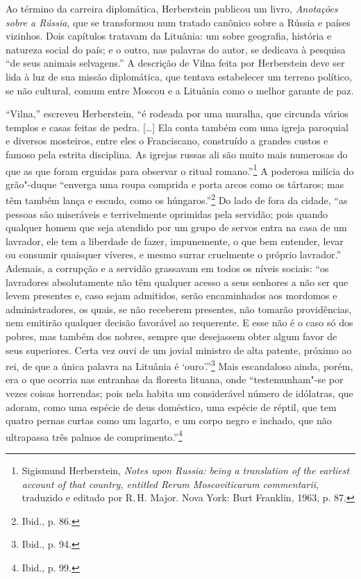 Ao término da carreira diplomática, Herberstein publicou um livro,
\textit{Anotações sobre a Rússia}, que se transformou num tratado canônico
sobre a Rússia e países vizinhos. Dois capítulos tratavam da Lituânia:
um sobre geografia, história e natureza social do país; e o outro, nas
palavras do autor, se dedicava à pesquisa ``de seus animais selvagens.''
A descrição de Vilna feita por Herberstein deve ser lida à luz de sua
missão diplomática, que tentava estabelecer um terreno político, se não
cultural, comum entre Moscou e a Lituânia como o melhor garante de paz.

``Vilna,'' escreveu Herberstein, ``é rodeada por uma muralha, que
circunda vários templos e casas feitas de pedra. {[}\ldots{}{]} Ela
conta também com uma igreja paroquial e diversos mosteiros, entre eles o
Franciscano, construído a grandes custos e famoso pela estrita
disciplina. As igrejas russas ali são muito mais numerosas do que as que
foram erguidas para observar o ritual romano.''\footnote{Sigismund Herberstein, \textit{Notes upon Russia: being a translation of the earliest account of that country, entitled Rerum Moscoviticarum commentarii}, traduzido e editado por R.\,H. Major. Nova York: Burt Franklin, 1963, p. 87.} A poderosa milícia do grão"-duque ``enverga uma roupa comprida e porta arcos como os tártaros; mas têm também lança e
escudo, como os húngaros.''\footnote{Ibid., p. 86.} Do lado de fora da
cidade, ``as pessoas são miseráveis e terrivelmente oprimidas pela
servidão; pois quando qualquer homem que seja atendido por um grupo de
servos entra na casa de um lavrador, ele tem a liberdade de fazer,
impunemente, o que bem entender, levar ou consumir quaisquer víveres, e
mesmo surrar cruelmente o próprio lavrador.'' Ademais, a corrupção e a
servidão grassavam em todos os níveis sociais: ``os lavradores
absolutamente não têm qualquer acesso a seus senhores a não ser que
levem presentes e, caso sejam admitidos, serão encaminhados aos mordomos
e administradores, os quais, se não receberem presentes, não tomarão
providências, nem emitirão qualquer decisão favorável ao requerente. E
esse não é o caso só dos pobres, mas também dos nobres, sempre que
desejassem obter algum favor de seus superiores. Certa vez ouvi de um
jovial ministro de alta patente, próximo ao rei, de que a única palavra
na Lituânia é `ouro'.''\footnote{Ibid., p. 94.} Mais escandaloso ainda,
porém, era o que ocorria nas entranhas da floresta lituana, onde
``testemunham"-se por vezes coisas horrendas; pois nela habita um
considerável número de idólatras, que adoram, como uma espécie de deus
doméstico, uma espécie de réptil, que tem quatro pernas curtas como um
lagarto, e um corpo negro e inchado, que não ultrapassa três palmos de
comprimento.''\footnote{Ibid., p. 99.}

